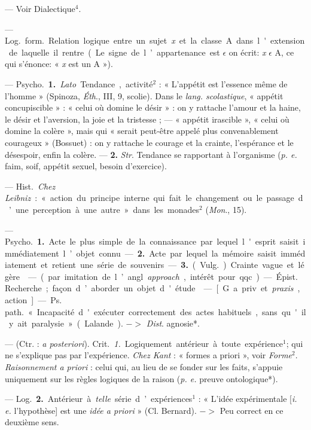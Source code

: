\begin{itemize}[leftmargin=1cm, label=, itemsep=1pt]
{{ — Voir Dialectique$^4$.

 — \si{Log.} \si{form.} Relation
logique entre un sujet {\it x} et la
classe A dans l'extension de laquelle
il rentre (Le signe de l’appartenance
est $\epsilon$ on écrit: {\it x} $\epsilon$ A, ce qui s’énonce:
« {\it x} est un A »).

— \si{Psycho.} {\bf 1.} {\it Lato}. Tendance,
activité$^2$ : « L'appétit est l'essence
même de l’homme » (Spinoza, {\it Éth}.,
III, 9, scolie). Dans le {\it lang. scolastique}, « appétit concupiscible » :
« celui où domine le désir » : on y
rattache l'amour et la haine, le désir
et l’aversion, la joie et la tristesse ; —
« appétit irascible », « celui où domine
la colère », mais qui « serait peut-être
appelé plus convenablement courageux » (Bossuet) : on y rattache le
courage et la crainte, l'espérance et
le désespoir, enfin la colère. — {\bf 2.} {\it Str}.
Tendance se rapportant à l'organisme ({\it p. e.} faim, soif, appétit sexuel,
besoin d’exercice).

 — \si{Hist.} {\it Chez Leibniz} :
« action du principe interne qui fait
le changement ou le passage d’une
perception à une autre » dans les
monades$^2$ ({\it Mon}., 15).

 — \si{Psycho.} {\bf 1.} Acte le
plus simple de la connaissance par
lequel l'esprit saisit immédiatement
l’objet connu. — {\bf 2.} Acte par lequel
la mémoire saisit immédiatement et
retient une série de souvenirs. —
 {\bf 3.} (\si{Vulg.}) Crainte vague et légère.

 — (par imitation de l’angl.
{\it approach}, intérêt pour qqc). —
\si{Épist.} Recherche; façon d’aborder
un objet d'étude.

 — [G. a priv. et {\it praxis}, action]
— \si{Ps. path.} « Incapacité d'exécuter
correctement des actes habituels,
sans qu'il y ait paralysie » (Lalande).
$->$ {\it Dist}. agnosie*.

 — (Ctr. : {\it a posteriori}). \si{Crit.}
{\it 1.} Logiquement antérieur à toute
expérience$^1$; qui ne s'explique pas
par l'expérience. {\it Chez Kant} : « formes
a priori », voir {\it Forme}$^2$. {\it Raisonnement a priori} : celui qui, au lieu de
se fonder sur les faits, s’appuie uniquement sur les règles logiques de la
raison ({\it p. e.} preuve ontologique*).

— \si{Log.} {\bf 2.} Antérieur à {\it telle} série
d’expériences$^1$ : « L'idée expérimentale [{\it i. e.} l'hypothèse] est une {\it idée
a priori} » (Cl. Bernard). $->$ Peu
correct en ce deuxième sens.

}}
\end{itemize}
